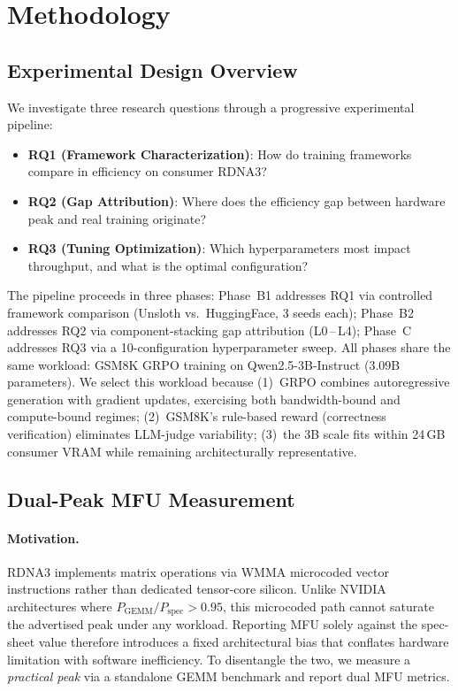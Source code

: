 \section{Methodology}
\label{sec:methodology}

\subsection{Experimental Design Overview}

We investigate three research questions through a progressive experimental pipeline:
\begin{itemize}
    \item \textbf{RQ1 (Framework Characterization)}: How do training frameworks compare in efficiency on consumer RDNA3?
    \item \textbf{RQ2 (Gap Attribution)}: Where does the efficiency gap between hardware peak and real training originate?
    \item \textbf{RQ3 (Tuning Optimization)}: Which hyperparameters most impact throughput, and what is the optimal configuration?
\end{itemize}

\noindent The pipeline proceeds in three phases: Phase~B1 addresses RQ1 via controlled framework comparison (Unsloth vs.\ HuggingFace, 3 seeds each); Phase~B2 addresses RQ2 via component-stacking gap attribution (L0\,--\,L4); Phase~C addresses RQ3 via a 10-configuration hyperparameter sweep. All phases share the same workload: GSM8K GRPO training on Qwen2.5-3B-Instruct (3.09B parameters). We select this workload because (1)~GRPO combines autoregressive generation with gradient updates, exercising both bandwidth-bound and compute-bound regimes; (2)~GSM8K's rule-based reward (correctness verification) eliminates LLM-judge variability; (3)~the 3B scale fits within 24\,GB consumer VRAM while remaining architecturally representative.

\subsection{Dual-Peak MFU Measurement}
\label{sec:dual-peak}

\paragraph{Motivation.} RDNA3 implements matrix operations via WMMA microcoded vector instructions rather than dedicated tensor-core silicon. Unlike NVIDIA architectures where $P_{\text{GEMM}}/P_{\text{spec}} > 0.95$, this microcoded path cannot saturate the advertised peak under any workload. Reporting MFU solely against the spec-sheet value therefore introduces a fixed architectural bias that conflates hardware limitation with software inefficiency. To disentangle the two, we measure a \emph{practical peak} via a standalone GEMM benchmark and report dual MFU metrics.

